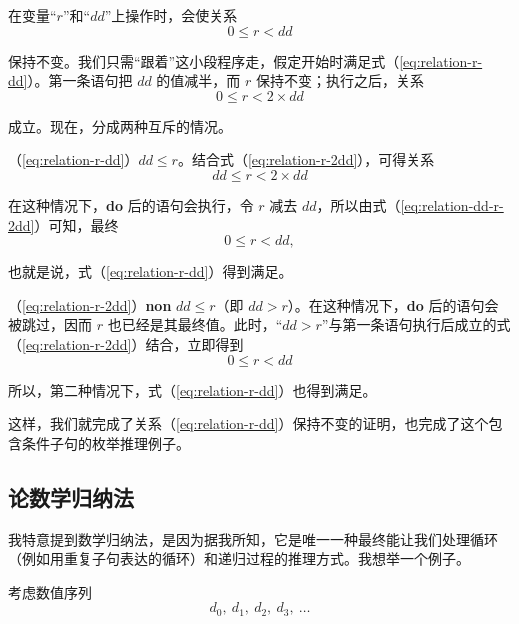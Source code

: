 \documentclass[twoside,11pt,fontset=none]{ctexbook}
\begin{document}
\noindent
在变量“$r$”和“$dd$”上操作时，会使关系
\begin{equation}
	\label{eq:relation-r-dd}
	0 \leqslant r < dd
\end{equation}

\noindent
保持不变。我们只需“跟着”这小段程序走，假定开始时满足式（\ref{eq:relation-r-dd}）。第一条语句把 $dd$ 的值减半，而 $r$ 保持不变；执行之后，关系
\begin{equation}
	\label{eq:relation-r-2dd}
	0 \leqslant r < 2\times dd
\end{equation}

\noindent
成立。现在，分成两种互斥的情况。

（\ref{eq:relation-r-dd}）$dd \leqslant r$。结合式（\ref{eq:relation-r-2dd}），可得关系
\begin{equation}
	\label{eq:relation-dd-r-2dd}
	dd \leqslant r < 2\times dd
\end{equation}

\noindent
在这种情况下，\textbf{do} 后的语句会执行，令 $r$ 减去 $dd$，所以由式（\ref{eq:relation-dd-r-2dd}）可知，最终
\begin{equation*}
	0 \leqslant r < dd,
\end{equation*}

\noindent
也就是说，式（\ref{eq:relation-r-dd}）得到满足。

（\ref{eq:relation-r-2dd}）\textbf{non} $dd \leqslant r$（即 $dd > r$）。在这种情况下，\textbf{do} 后的语句会被跳过，因而 $r$ 也已经是其最终值。此时，“$dd > r$”与第一条语句执行后成立的式（\ref{eq:relation-r-2dd}）结合，立即得到
\begin{equation*}
	0 \leqslant r < dd
\end{equation*}

\noindent
所以，第二种情况下，式（\ref{eq:relation-r-dd}）也得到满足。

这样，我们就完成了关系（\ref{eq:relation-r-dd}）保持不变的证明，也完成了这个包含条件子句的枚举推理例子。

\subsection{论数学归纳法}
\label{subsec:mathematical-induction}

我特意提到数学归纳法，是因为据我所知，它是唯一一种最终能让我们处理循环（例如用重复子句表达的循环）和递归过程的推理方式。我想举一个例子。

考虑数值序列
\begin{equation}
	\label{eq:induction-d}
	d_0,\ d_1,\ d_2,\ d_3,\ \dotso
\end{equation}
\end{document}
